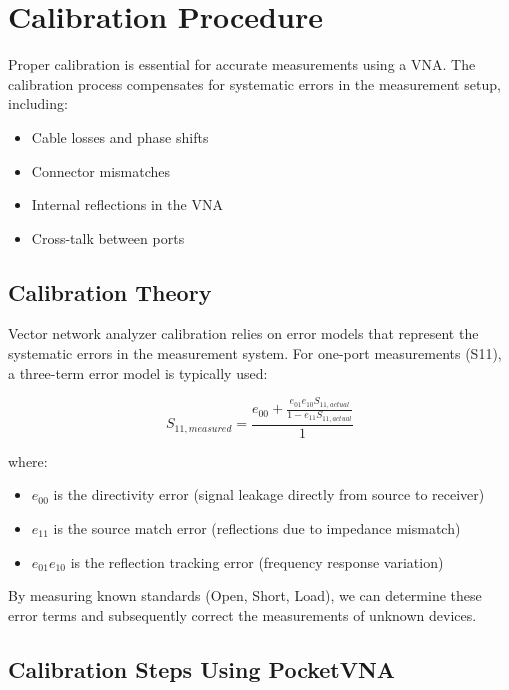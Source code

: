 \documentclass[11pt,a4paper]{article}
\begin{document}
\section{Calibration Procedure}

Proper calibration is essential for accurate measurements using a VNA. The calibration process compensates for systematic errors in the measurement setup, including:

\begin{itemize}
    \item Cable losses and phase shifts
    \item Connector mismatches
    \item Internal reflections in the VNA
    \item Cross-talk between ports
\end{itemize}

\subsection{Calibration Theory}

Vector network analyzer calibration relies on error models that represent the systematic errors in the measurement system. For one-port measurements (S11), a three-term error model is typically used:

\begin{equation}
    S_{11,measured} = \frac{e_{00} + \frac{e_{01}e_{10}S_{11,actual}}{1-e_{11}S_{11,actual}}}{1}
\end{equation}

where:
\begin{itemize}
    \item $e_{00}$ is the directivity error (signal leakage directly from source to receiver)
    \item $e_{11}$ is the source match error (reflections due to impedance mismatch)
    \item $e_{01}e_{10}$ is the reflection tracking error (frequency response variation)
\end{itemize}

By measuring known standards (Open, Short, Load), we can determine these error terms and subsequently correct the measurements of unknown devices.

\subsection{Calibration Steps Using PocketVNA}
\end{document}
